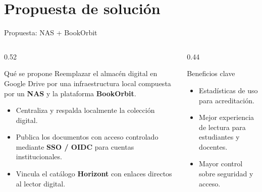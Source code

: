 \documentclass[aspectratio=169,10pt]{beamer}
\begin{document}
\section{Propuesta de solución}
\begin{frame}{Propuesta: NAS + BookOrbit}
  \begin{columns}[T]
    \begin{column}{0.52\textwidth}
      \begin{block}{Qué se propone}
        \small
        Reemplazar el almacén digital en Google Drive por una infraestructura local compuesta por un \textbf{NAS} y la plataforma \textbf{BookOrbit}.
      \end{block}
      \vspace{0.4em}
      \begin{itemize}\small
        \item Centraliza y respalda localmente la colección digital.
        \item Publica los documentos con acceso controlado mediante \textbf{SSO / OIDC} para cuentas institucionales.
        \item Vincula el catálogo \textbf{Horizont} con enlaces directos al lector digital.
      \end{itemize}
    \end{column}
    \begin{column}{0.44\textwidth}
      \begin{block}{Beneficios clave}
        \small
        \begin{itemize}
          \item Estadísticas de uso para acreditación.
          \item Mejor experiencia de lectura para estudiantes y docentes.
          \item Mayor control sobre seguridad y acceso.
        \end{itemize}
      \end{block}
    \end{column}
  \end{columns}
\end{frame}

\begin{frame}
  \titlepage
\end{frame}


\end{document}
